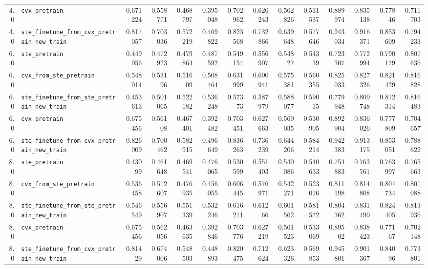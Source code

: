 \begin{longtable}{@{}r l *{12}{r}@{}}
4.0 & \texttt{cvx\_pretrain} & 0.671224 & 0.558771 & 0.468797 & 0.395048 & 0.702962 & 0.626243 & 0.562826 & 0.531537 & 0.889974 & 0.835138 & 0.77846 & 0.711703 \\
4.0 & \texttt{ste\_finetune\_from\_cvx\_pretrain\_new\_train} & 0.817057 & 0.703036 & 0.572219 & 0.469822 & 0.823568 & 0.732866 & 0.639648 & 0.577646 & 0.943034 & 0.916371 & 0.853609 & 0.794233 \\
6.0 & \texttt{ste\_pretrain} & 0.449056 & 0.472923 & 0.479864 & 0.487592 & 0.549154 & 0.556907 & 0.54827 & 0.54339 & 0.723307 & 0.772994 & 0.790179 & 0.807636 \\
6.0 & \texttt{cvx\_from\_ste\_pretrain} & 0.548014 & 0.53196 & 0.51609 & 0.508464 & 0.631999 & 0.600941 & 0.575381 & 0.560355 & 0.825033 & 0.827326 & 0.821429 & 0.816828 \\
6.0 & \texttt{ste\_finetune\_from\_ste\_pretrain\_new\_train} & 0.453613 & 0.501065 & 0.522182 & 0.536248 & 0.57373 & 0.587979 & 0.588077 & 0.59015 & 0.779948 & 0.809748 & 0.812314 & 0.816483 \\
6.0 & \texttt{cvx\_pretrain} & 0.675456 & 0.56108 & 0.467401 & 0.392482 & 0.703451 & 0.627663 & 0.560035 & 0.530905 & 0.892904 & 0.836026 & 0.777809 & 0.704657 \\
6.0 & \texttt{ste\_finetune\_from\_cvx\_pretrain\_new\_train} & 0.826009 & 0.700462 & 0.582915 & 0.496649 & 0.836263 & 0.736239 & 0.644206 & 0.584214 & 0.942383 & 0.913175 & 0.853051 & 0.788622 \\
8.0 & \texttt{ste\_pretrain} & 0.43099 & 0.461648 & 0.469541 & 0.476065 & 0.530599 & 0.551403 & 0.540086 & 0.540633 & 0.754883 & 0.763761 & 0.763997 & 0.765663 \\
8.0 & \texttt{cvx\_from\_ste\_pretrain} & 0.536458 & 0.512607 & 0.476935 & 0.456055 & 0.606445 & 0.576971 & 0.542271 & 0.523016 & 0.811198 & 0.814808 & 0.804734 & 0.801088 \\
8.0 & \texttt{ste\_finetune\_from\_ste\_pretrain\_new\_train} & 0.546549 & 0.556907 & 0.551339 & 0.532246 & 0.616211 & 0.61266 & 0.601562 & 0.581572 & 0.804362 & 0.831499 & 0.824405 & 0.813936 \\
8.0 & \texttt{cvx\_pretrain} & 0.675456 & 0.562056 & 0.463635 & 0.392846 & 0.703776 & 0.627219 & 0.561523 & 0.533069 & 0.89502 & 0.838423 & 0.77167 & 0.702148 \\
8.0 & \texttt{ste\_finetune\_from\_cvx\_pretrain\_new\_train} & 0.81429 & 0.674006 & 0.548503 & 0.448893 & 0.820475 & 0.712624 & 0.623326 & 0.569853 & 0.945801 & 0.901367 & 0.84096 & 0.773801 \\

\end{longtable}
